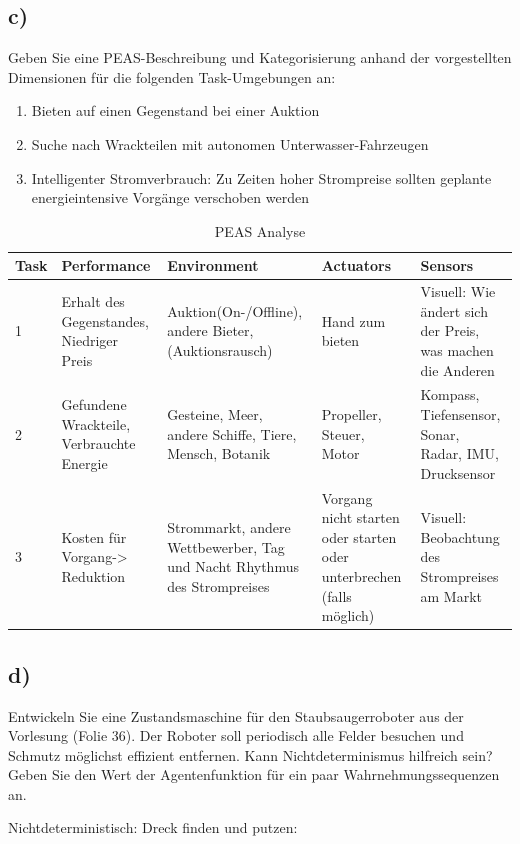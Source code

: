 \documentclass[10pt]{article}%
\theoremstyle{nonumberplain}
\begin{document}
\subsection{c)}
Geben Sie eine PEAS-Beschreibung und Kategorisierung anhand der vorgestellten Dimensionen für die folgenden Task-Umgebungen an:
\begin{enumerate}
	\item Bieten auf einen Gegenstand bei einer Auktion
	\item Suche nach Wrackteilen mit autonomen Unterwasser-Fahrzeugen
	\item Intelligenter Stromverbrauch: Zu Zeiten hoher Strompreise sollten geplante energieintensive Vorgänge verschoben werden
\end{enumerate}

\begin{table}
	\centering
	\begin{tabular}{p{0.5cm}|p{3cm}|p{3cm}|p{3cm}|p{3cm}}
		Task  &	Performance & Environment & Actuators & Sensors \\
		\hline
		1 & Erhalt des Gegenstandes, Niedriger Preis & Auktion(On-/Offline), andere Bieter, (Auktionsrausch) & Hand zum bieten & Visuell: Wie ändert sich der Preis, was machen die Anderen \\
		\hline
		2 & Gefundene Wrackteile, Verbrauchte Energie & Gesteine, Meer, andere Schiffe, Tiere, Mensch, Botanik & Propeller, Steuer, Motor & Kompass, Tiefensensor, Sonar, Radar, IMU, Drucksensor \\
		\hline
		3 & Kosten für Vorgang-> Reduktion & Strommarkt, andere Wettbewerber, Tag und Nacht Rhythmus des Strompreises & Vorgang nicht starten oder starten oder unterbrechen (falls möglich) & Visuell: Beobachtung des Strompreises am Markt \\
	\end{tabular}
	\caption{PEAS Analyse}
\end{table}

\subsection{d)}
Entwickeln Sie eine Zustandsmaschine für den Staubsaugerroboter aus der Vorlesung (Folie
36). Der Roboter soll periodisch alle Felder besuchen und Schmutz möglichst effizient entfernen. Kann Nichtdeterminismus hilfreich sein? Geben Sie den Wert der Agentenfunktion
für ein paar Wahrnehmungssequenzen an.

Nichtdeterministisch: Dreck finden und putzen:
\end{document}
